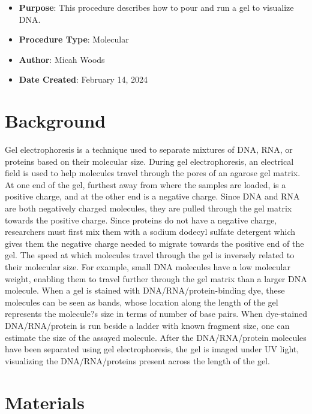 \documentclass[
  letterpaper,
  DIV=11,
  numbers=noendperiod]{scrreprt}
\providecommand{\tightlist}{%
  \setlength{\itemsep}{0pt}\setlength{\parskip}{0pt}}\usepackage{longtable,booktabs,array}
\begin{document}
\begin{itemize}
\tightlist
\item
  \textbf{Purpose}: This procedure describes how to pour and run a gel
  to visualize DNA.
\item
  \textbf{Procedure Type}: Molecular
\item
  \textbf{Author}: Micah Woods
\item
  \textbf{Date Created}: February 14, 2024
\end{itemize}

\hypertarget{background}{%
\section{Background}\label{background}}

Gel electrophoresis is a technique used to separate mixtures of DNA,
RNA, or proteins based on their molecular size. During gel
electrophoresis, an electrical field is used to help molecules travel
through the pores of an agarose gel matrix. At one end of the gel,
furthest away from where the samples are loaded, is a positive charge,
and at the other end is a negative charge. Since DNA and RNA are both
negatively charged molecules, they are pulled through the gel matrix
towards the positive charge. Since proteins do not have a negative
charge, researchers must first mix them with a sodium dodecyl sulfate
detergent which gives them the negative charge needed to migrate towards
the positive end of the gel. The speed at which molecules travel through
the gel is inversely related to their molecular size. For example, small
DNA molecules have a low molecular weight, enabling them to travel
further through the gel matrix than a larger DNA molecule. When a gel is
stained with DNA/RNA/protein-binding dye, these molecules can be seen as
bands, whose location along the length of the gel represents the
molecule?s size in terms of number of base pairs. When dye-stained
DNA/RNA/protein is run beside a ladder with known fragment size, one can
estimate the size of the assayed molecule. After the DNA/RNA/protein
molecules have been separated using gel electrophoresis, the gel is
imaged under UV light, visualizing the DNA/RNA/proteins present across
the length of the gel.

\hypertarget{materials-16}{%
\section{Materials}\label{materials-16}}
\end{document}
